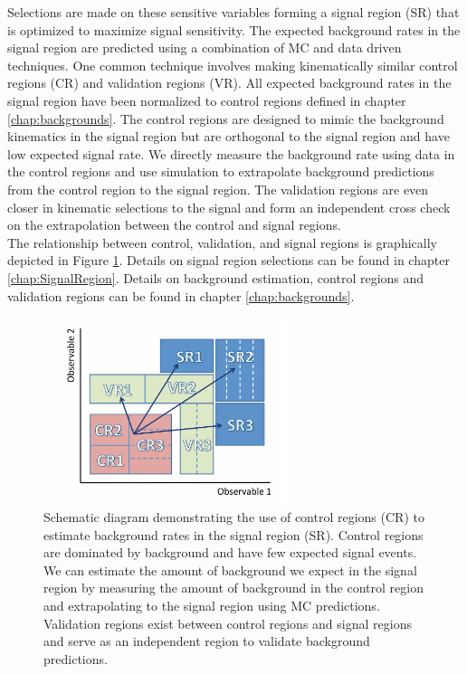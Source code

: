 \indent Selections are made on these sensitive variables forming a signal region (SR) that is optimized to maximize signal sensitivity.  The expected background rates in the signal region are predicted using a combination of MC and data driven techniques.  One common technique involves making kinematically similar control regions (CR) and validation regions (VR). All expected background rates in the signal region have been normalized to control regions defined in chapter \ref{chap:backgrounds}.  The control regions are designed to mimic the background kinematics in the signal region but are orthogonal to the signal region and have low expected signal rate.  We directly measure the background rate using data in the control regions and use simulation to extrapolate background predictions from the control region to the signal region. The validation regions are even closer in kinematic selections to the signal and form an independent cross check on the extrapolation between the control and signal regions. \\

\indent The relationship between control, validation, and signal regions is graphically depicted in Figure \ref{fig:CR_VR_SR_stat1}.  Details on signal region selections can be found in chapter \ref{chap:SignalRegion}.  Details on background estimation, control regions and validation regions can be found in chapter \ref{chap:backgrounds}. \\

\begin{figure}[h!]
  \centering
	\includegraphics[width=0.65\textwidth]{./figures/statistics/CR_VR_SR.pdf}
\caption[Schematic diagram demonstrating the use of control regions to estimate background rates in the signal region]{Schematic diagram demonstrating the use of control regions (CR) to estimate background rates in the signal region (SR).  Control regions are dominated by background and have few expected signal events.  We can estimate the amount of background we expect in the signal region by measuring the amount of background in the control region and extrapolating to the signal region using MC predictions. Validation regions exist between control regions and signal regions and serve as an independent region to validate background predictions.  }
\label{fig:CR_VR_SR_stat1}
\end{figure}

